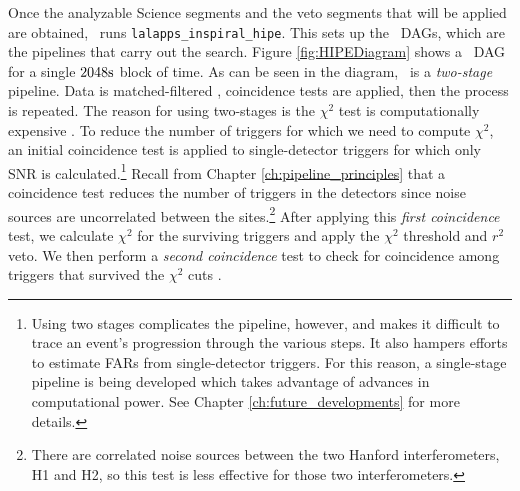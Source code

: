 Once the analyzable Science segments and the veto segments that will be applied
are obtained, \ihope~runs \texttt{lalapps\_inspiral\_hipe}. This sets up the
\hipe~\acp{DAG}, which are the pipelines that carry out the search. Figure
\ref{fig:HIPEDiagram} shows a \hipe~\ac{DAG} for a single $2048\rm{s}$ block of
time. As can be seen in the diagram, \hipe~is a \emph{two-stage} pipeline. Data
is matched-filtered \cite{Brown}, coincidence tests \cite{Robinson:2008} are applied, then the process is
repeated. The reason for using two-stages is the $\chi^2$ test is
computationally expensive \cite{Allen:2005fk}. To reduce the number of triggers for which we need
to compute $\chi^2$, an initial coincidence test is applied to single-detector
triggers for which only \ac{SNR} is calculated.\footnote{Using two stages
complicates the pipeline, however, and makes it difficult to trace an event's
progression through the various steps. It also hampers efforts to estimate
\acp{FAR} from single-detector triggers. For this reason, a single-stage
pipeline is being developed which takes advantage of advances in computational
power. See Chapter \ref{ch:future_developments} for more details.} Recall from
Chapter \ref{ch:pipeline_principles} that a coincidence test reduces the number
of triggers in the detectors since noise sources are uncorrelated between the
sites.\footnote{There are correlated noise sources between the two Hanford
interferometers, H1 and H2, so this test is less effective for those two
interferometers.} After applying this \emph{first coincidence} test, we
calculate $\chi^2$ for the surviving triggers and apply the $\chi^2$ threshold
and $r^2$ veto. We then perform a \emph{second coincidence} test to check for
coincidence among triggers that survived the $\chi^2$ cuts \cite{Allen:2005fk}.


